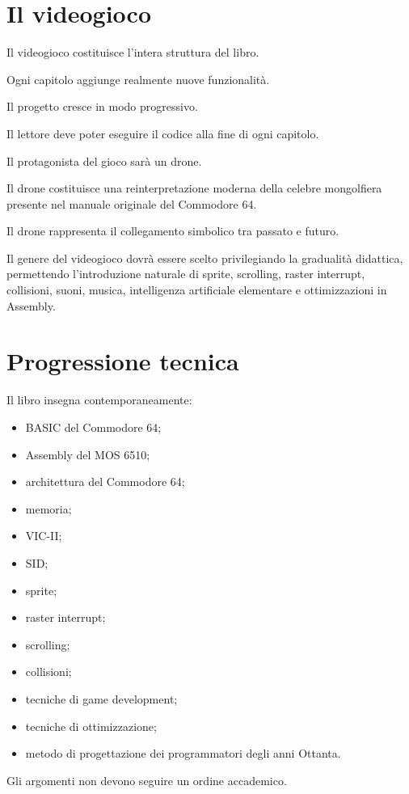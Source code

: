 \documentclass{article}
\begin{document}


\section{Il videogioco}
Il videogioco costituisce l'intera struttura del libro.

Ogni capitolo aggiunge realmente nuove funzionalità.

Il progetto cresce in modo progressivo.

Il lettore deve poter eseguire il codice alla fine di ogni capitolo.

Il protagonista del gioco sarà un drone.

Il drone costituisce una reinterpretazione moderna della celebre mongolfiera presente nel manuale originale del
Commodore 64.

Il drone rappresenta il collegamento simbolico tra passato e futuro.

Il genere del videogioco dovrà essere scelto privilegiando la gradualità didattica, permettendo l'introduzione naturale
di sprite, scrolling, raster interrupt, collisioni, suoni, musica, intelligenza artificiale elementare e ottimizzazioni
in Assembly.



\section{Progressione tecnica}
Il libro insegna contemporaneamente:

\begin{itemize}
\item BASIC del Commodore 64; 
\item Assembly del MOS 6510; 
\item architettura del Commodore 64; 
\item memoria; 
\item VIC-II; 
\item SID; 
\item sprite; 
\item raster interrupt; 
\item scrolling; 
\item collisioni; 
\item tecniche di game development; 
\item tecniche di ottimizzazione; 
\item metodo di progettazione dei programmatori degli anni Ottanta. 
\end{itemize}
Gli argomenti non devono seguire un ordine accademico.
\end{document}
